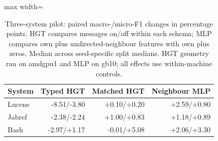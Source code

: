 \begin{table}[t]
\centering\small
\caption{Three-system pilot: paired macro-/micro-F1 changes in percentage points. HGT compares messages on/off within each schema; MLP compares own plus undirected-neighbour features with own plus zeros. Median across seed-specific split medians. HGT geometry ran on amdgpu1 and MLP on gb10; all effects use within-machine controls.\label{tab:pilot_controls}}
\begin{adjustbox}{max width=\columnwidth}
\begin{tabular}{lrrr}
\toprule
System & Typed HGT & Matched HGT & Neighbour MLP \\
\midrule
Lucene & -8.51/-3.80 & +0.10/+0.20 & +2.59/+0.80 \\
Jabref & -2.38/-2.24 & +1.00/+0.83 & +1.18/+0.89 \\
Bash & -2.97/+1.17 & -0.01/+5.08 & +2.06/+3.30 \\
\bottomrule
\end{tabular}
\end{adjustbox}
\end{table}
